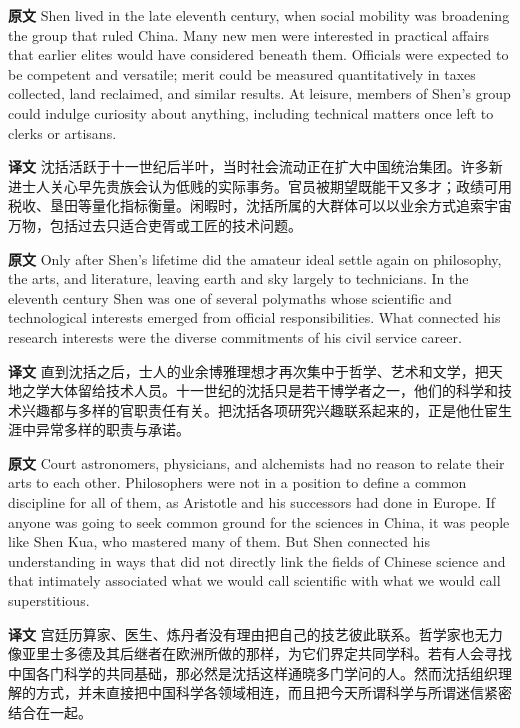 \documentclass[UTF8,zihao=-4]{ctexart}
\newcommand{\BodyFont}{\fontsize{10.5pt}{15.5pt}\selectfont}
\newcommand{\origlabel}{\textbf{原文}\quad}
\newcommand{\translabel}{\textbf{译文}\quad}
\newenvironment{enblock}{\par\noindent\begingroup\BodyFont\origlabel}{\par\endgroup}
\newenvironment{zhblock}{\par\noindent\begingroup\BodyFont\translabel}{\par\endgroup\vspace{0.35em}}
\begin{document}
\begin{enblock}
Shen lived in the late eleventh century, when social mobility was broadening the group that ruled China. Many new men were interested in practical affairs that earlier elites would have considered beneath them. Officials were expected to be competent and versatile; merit could be measured quantitatively in taxes collected, land reclaimed, and similar results. At leisure, members of Shen's group could indulge curiosity about anything, including technical matters once left to clerks or artisans.
\end{enblock}
\begin{zhblock}
沈括活跃于十一世纪后半叶，当时社会流动正在扩大中国统治集团。许多新进士人关心早先贵族会认为低贱的实际事务。官员被期望既能干又多才；政绩可用税收、垦田等量化指标衡量。闲暇时，沈括所属的大群体可以以业余方式追索宇宙万物，包括过去只适合吏胥或工匠的技术问题。
\end{zhblock}

\begin{enblock}
Only after Shen's lifetime did the amateur ideal settle again on philosophy, the arts, and literature, leaving earth and sky largely to technicians. In the eleventh century Shen was one of several polymaths whose scientific and technological interests emerged from official responsibilities. What connected his research interests were the diverse commitments of his civil service career.
\end{enblock}
\begin{zhblock}
直到沈括之后，士人的业余博雅理想才再次集中于哲学、艺术和文学，把天地之学大体留给技术人员。十一世纪的沈括只是若干博学者之一，他们的科学和技术兴趣都与多样的官职责任有关。把沈括各项研究兴趣联系起来的，正是他仕宦生涯中异常多样的职责与承诺。
\end{zhblock}

\begin{enblock}
Court astronomers, physicians, and alchemists had no reason to relate their arts to each other. Philosophers were not in a position to define a common discipline for all of them, as Aristotle and his successors had done in Europe. If anyone was going to seek common ground for the sciences in China, it was people like Shen Kua, who mastered many of them. But Shen connected his understanding in ways that did not directly link the fields of Chinese science and that intimately associated what we would call scientific with what we would call superstitious.
\end{enblock}
\begin{zhblock}
宫廷历算家、医生、炼丹者没有理由把自己的技艺彼此联系。哲学家也无力像亚里士多德及其后继者在欧洲所做的那样，为它们界定共同学科。若有人会寻找中国各门科学的共同基础，那必然是沈括这样通晓多门学问的人。然而沈括组织理解的方式，并未直接把中国科学各领域相连，而且把今天所谓科学与所谓迷信紧密结合在一起。
\end{zhblock}
\end{document}
